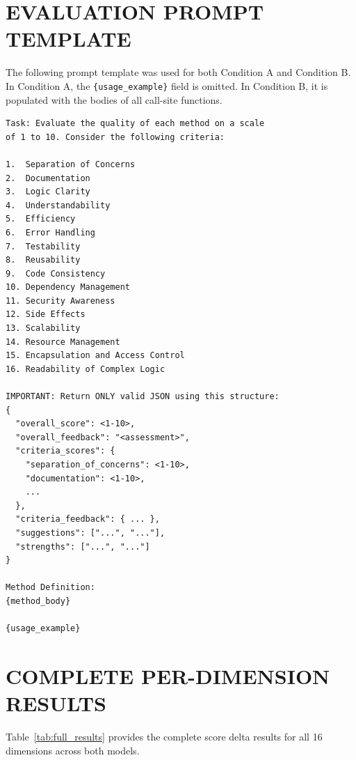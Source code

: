 \documentclass[12pt]{report}
\begin{document}
\appendix

\chapter{EVALUATION PROMPT TEMPLATE}

The following prompt template was used for both Condition A and Condition B. In Condition A, the \texttt{\{usage\_example\}} field is omitted. In Condition B, it is populated with the bodies of all call-site functions.

\begin{lstlisting}[language={}, caption={Evaluation prompt template used in both experimental conditions.}]
Task: Evaluate the quality of each method on a scale
of 1 to 10. Consider the following criteria:

1.  Separation of Concerns
2.  Documentation
3.  Logic Clarity
4.  Understandability
5.  Efficiency
6.  Error Handling
7.  Testability
8.  Reusability
9.  Code Consistency
10. Dependency Management
11. Security Awareness
12. Side Effects
13. Scalability
14. Resource Management
15. Encapsulation and Access Control
16. Readability of Complex Logic

IMPORTANT: Return ONLY valid JSON using this structure:
{
  "overall_score": <1-10>,
  "overall_feedback": "<assessment>",
  "criteria_scores": {
    "separation_of_concerns": <1-10>,
    "documentation": <1-10>,
    ...
  },
  "criteria_feedback": { ... },
  "suggestions": ["...", "..."],
  "strengths": ["...", "..."]
}

Method Definition:
{method_body}

{usage_example}
\end{lstlisting}

\chapter{COMPLETE PER-DIMENSION RESULTS}

Table~\ref{tab:full_results} provides the complete score delta results for all 16 dimensions across both models.
\end{document}

